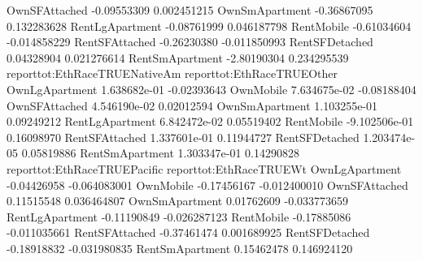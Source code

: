 \documentclass{article}
\begin{document}
\begin{Schunk}
\begin{Soutput}
OwnSFAttached                  -0.09553309                0.002451215
OwnSmApartment                 -0.36867095                0.132283628
RentLgApartment                -0.08761999                0.046187798
RentMobile                     -0.61034604               -0.014858229
RentSFAttached                 -0.26230380               -0.011850993
RentSFDetached                  0.04328904                0.021276614
RentSmApartment                -2.80190304                0.234295539
                reporttot:EthRaceTRUENativeAm reporttot:EthRaceTRUEOther
OwnLgApartment                   1.638682e-01                -0.02393643
OwnMobile                        7.634675e-02                -0.08188404
OwnSFAttached                    4.546190e-02                 0.02012594
OwnSmApartment                   1.103255e-01                 0.09249212
RentLgApartment                  6.842472e-02                 0.05519402
RentMobile                      -9.102506e-01                 0.16098970
RentSFAttached                   1.337601e-01                 0.11944727
RentSFDetached                   1.203474e-05                 0.05819886
RentSmApartment                  1.303347e-01                 0.14290828
                reporttot:EthRaceTRUEPacific reporttot:EthRaceTRUEWt
OwnLgApartment                   -0.04426958            -0.064083001
OwnMobile                        -0.17456167            -0.012400010
OwnSFAttached                     0.11515548             0.036464807
OwnSmApartment                    0.01762609            -0.033773659
RentLgApartment                  -0.11190849            -0.026287123
RentMobile                       -0.17885086            -0.011035661
RentSFAttached                   -0.37461474             0.001689925
RentSFDetached                   -0.18918832            -0.031980835
RentSmApartment                   0.15462478             0.146924120


\end{Soutput}
\end{Schunk}
\end{document}
